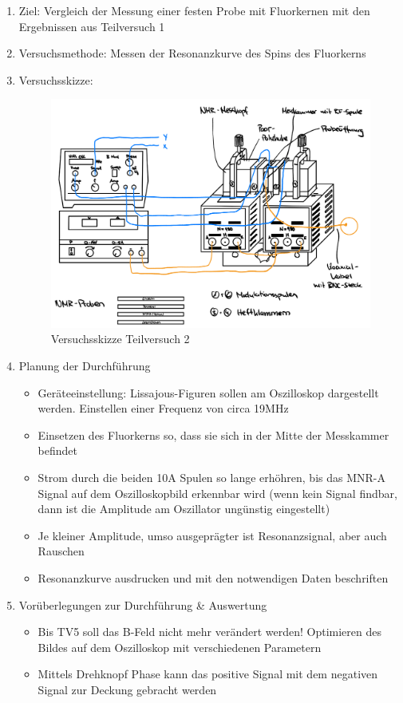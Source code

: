 \documentclass{article}
\begin{document}
\begin{enumerate}[label = (\Roman*)]
    \item Ziel: Vergleich der Messung einer festen Probe mit Fluorkernen mit den Ergebnissen aus Teilversuch 1
    
    \item Versuchsmethode: Messen der Resonanzkurve des Spins des Fluorkerns
    
    \item Versuchsskizze:
    
        \begin{figure}[H]
        \centering
        \includegraphics[width=0.7\linewidth]{Abbildungen/TV1-5.jpeg}
        \caption{Versuchsskizze Teilversuch 2}
        \end{figure}

    \item Planung der Durchführung
        \begin{itemize}
           \item Geräteeinstellung: Lissajous-Figuren sollen am Oszilloskop dargestellt werden. Einstellen einer Frequenz von circa 19MHz
            \item Einsetzen des Fluorkerns so, dass sie sich in der Mitte der Messkammer befindet
            \item Strom durch die beiden 10A Spulen so lange erhöhren, bis das MNR-A Signal auf dem Oszilloskopbild erkennbar wird (wenn kein Signal findbar, dann ist die Amplitude am Oszillator ungünstig eingestellt) 
            \item Je kleiner Amplitude, umso ausgeprägter ist Resonanzsignal, aber auch Rauschen
            \item Resonanzkurve ausdrucken und mit den notwendigen Daten beschriften
        \end{itemize}

    \item Vorüberlegungen zur Durchführung \& Auswertung
        \begin{itemize}
            \item Bis TV5 soll das B-Feld nicht mehr verändert werden! Optimieren des Bildes auf dem Oszilloskop mit verschiedenen Parametern
            \item Mittels Drehknopf Phase kann das positive Signal mit dem negativen Signal zur Deckung gebracht werden
        \end{itemize}
        
\end{enumerate}
\end{document}
